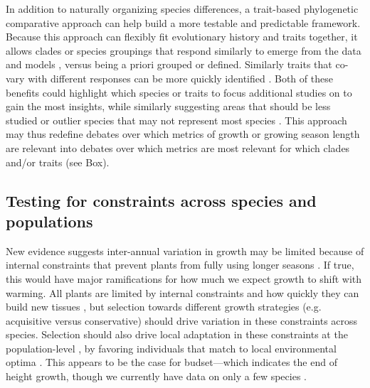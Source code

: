 \documentclass[11pt]{article}
\begin{document}
In addition to naturally organizing species differences, a trait-based phylogenetic comparative approach can help build a more testable and predictable framework. %
Because this approach can flexibly fit evolutionary history and traits together, it allows clades or species groupings that respond similarly to emerge from the data and models \citep{davies2019phylogenetically}, versus being a priori grouped or defined. Similarly traits that co-vary with different responses can be more quickly identified \citep[e.g.][see Fig. \ref{fig:phylomodel}]{willis2008phylogenetic,davies2019phylogenetically}. Both of these benefits could highlight which species or traits to focus additional studies on to gain the most insights, while similarly suggesting areas that should be less studied \citep[e.g. traits that may be too confounded with evolutionary history,][]{cornwell2014functional,westoby2023phylogenetically} or outlier species that may not represent most species \citep{morales2024phylogenetic}. This approach may thus redefine debates over which metrics of growth or growing season length are relevant into debates over which metrics are most relevant for which clades and/or traits (see Box). %


\subsection*{Testing for constraints across species and populations} %

New evidence suggests inter-annual variation in growth may be limited because of internal constraints that prevent plants from fully using longer seasons \citep{zohner2023effect}. If true, this would have major ramifications for how much we expect growth to shift with warming. All plants are limited by internal constraints and how quickly they can build new tissues \citep{marchand2021timing,luo2024internal}, but selection towards different growth strategies (e.g. acquisitive versus conservative) should drive variation in these constraints across species. Selection should also drive local adaptation in these constraints at the population-level \citep{mckown2016impacts,soolanayakanahally2013timing}, by favoring individuals that match to local environmental optima \citep{Colautti:2010,mckown2014np}. This appears to be the case for budset---which indicates the end of height growth, though we currently have data on only a few species \citep{aitken2016,zeng2024weak}. 
\end{document}
